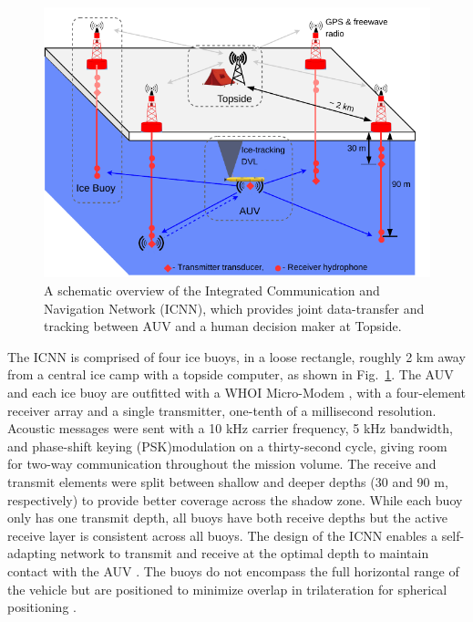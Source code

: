 \begin{figure}[h!]
	\centering
	\includegraphics[width=\reprintcolumnwidth]{figs/Fig2.pdf}
	\caption{A schematic overview of the Integrated Communication and Navigation Network (ICNN), which provides joint data-transfer and tracking between AUV and a human decision maker at Topside.}
	\label{fig:icnnOverview}
\end{figure}

The ICNN is comprised of four ice buoys, in a loose rectangle, roughly 2 km away from a central ice camp with a topside computer, as shown in Fig.~\ref{fig:icnnOverview}.
The AUV and each ice buoy are outfitted with a WHOI Micro-Modem \citep{singh_underwater_2006}, with a four-element receiver array and a single transmitter, one-tenth of a millisecond resolution.
Acoustic messages were sent with a 10 kHz carrier frequency, 5 kHz bandwidth, and phase-shift keying (PSK)modulation on a thirty-second cycle, giving room for two-way communication throughout the mission volume.
The receive and transmit elements were split between shallow and deeper depths (30 and 90 m, respectively) to provide better coverage across the shadow zone.
While each buoy only has one transmit depth, all buoys have both receive depths but the active receive layer is consistent across all buoys. 
The design of the ICNN enables a self-adapting network to transmit and receive at the optimal depth to maintain contact with the AUV \citep{schneider_self-adapting_2020}.
The buoys do not encompass the full horizontal range of the vehicle but are positioned to minimize overlap in trilateration for spherical positioning \citep{deffenbaugh_relationship_1996}.

